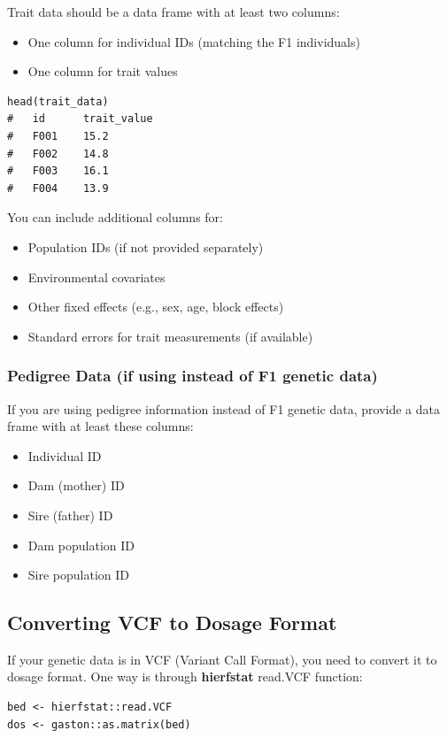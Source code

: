 \documentclass[11pt]{article}
\begin{document}
Trait data should be a data frame with at least two columns:
\begin{itemize}
\item One column for individual IDs (matching the F1 individuals)
\item One column for trait values
\end{itemize}

\begin{lstlisting}
head(trait_data)
#   id      trait_value
#   F001    15.2
#   F002    14.8
#   F003    16.1
#   F004    13.9
\end{lstlisting}

You can include additional columns for:
\begin{itemize}
\item Population IDs (if not provided separately)
\item Environmental covariates
\item Other fixed effects (e.g., sex, age, block effects)
\item Standard errors for trait measurements (if available)
\end{itemize}

\subsubsection{Pedigree Data (if using instead of F1 genetic data)}

If you are using pedigree information instead of F1 genetic data, provide a data frame with at least these columns:
\begin{itemize}
\item Individual ID
\item Dam (mother) ID
\item Sire (father) ID
\item Dam population ID
\item Sire population ID
\end{itemize}

\subsection{Converting VCF to Dosage Format}

If your genetic data is in VCF (Variant Call Format), you need to convert it to dosage format. One way is through \textbf{hierfstat} read.VCF function:

\begin{lstlisting}
bed <- hierfstat::read.VCF
dos <- gaston::as.matrix(bed)
\end{lstlisting}
\end{document}
